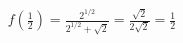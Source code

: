 \documentclass[preview]{standalone}
\begin{document}
\begin{align*}
f\!\left(\tfrac{1}{2}\right) = \frac{2^{1/2}}{2^{1/2}+\sqrt{2}} = \frac{\sqrt{2}}{2\sqrt{2}} = \frac{1}{2}
\end{align*}
\end{document}
